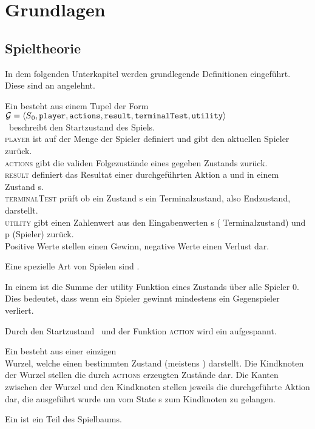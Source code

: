 \chapter{Grundlagen}
\section{Spieltheorie}
In dem folgenden Unterkapitel werden grundlegende Definitionen eingeführt. Diese sind an \cite{Russell.2016} angelehnt.
\begin{Definition}
Ein  besteht aus einem Tupel der Form \\[0.2cm]
  \hspace*{1.3cm}
  $\mathcal{G} = \langle S\textsubscript{0},\mathtt{player}, \mathtt{actions}, \mathtt{result}, \mathtt{terminalTest}, \mathtt{utility} \rangle$
\\\so\ beschreibt den Startzustand des Spiels.
\\\textsc{player} ist auf der Menge der Spieler definiert und gibt den aktuellen Spieler zurück.
\\\textsc{actions} gibt die validen Folgezustände eines gegeben Zustands zurück.
\\\textsc{result} definiert das Resultat einer durchgeführten Aktion a und in einem Zustand s.
\\\textsc{terminalTest} prüft ob ein Zustand s ein Terminalzustand, also Endzustand, darstellt.
\\\textsc{utility} gibt einen Zahlenwert aus den Eingabenwerten s ( Terminalzustand) und p (Spieler) zurück. \\Positive Werte stellen einen Gewinn, negative Werte einen Verlust dar.
\end{Definition}
Eine spezielle Art von Spielen sind .
\begin{Definition}
In einem  ist die Summe der utility Funktion eines Zustands über alle Spieler 0. Dies bedeutet, dass wenn ein Spieler gewinnt mindestens ein Gegenspieler verliert.
\end{Definition}
Durch den Startzustand \so\ und der Funktion \textsc{action} wird ein  aufgespannt.
\begin{Definition}
Ein  besteht aus einer einzigen \\Wurzel, welche einen bestimmten Zustand (meistens \so) darstellt. Die Kindknoten der Wurzel stellen die durch \textsc{actions} erzeugten Zustände dar. Die Kanten zwischen der Wurzel und den Kindknoten stellen jeweils die durchgeführte Aktion dar, die ausgeführt wurde um vom State s zum Kindknoten zu gelangen.
\end{Definition}
\begin{Definition}
Ein  ist ein Teil des Spielbaums.
\end{Definition}
